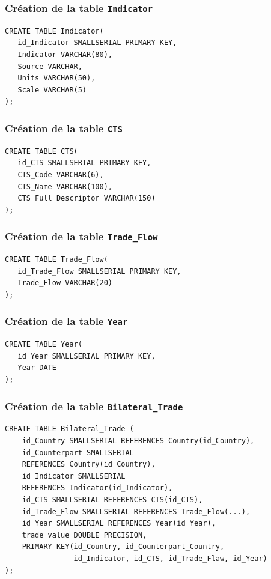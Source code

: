 \documentclass[11pt]{beamer}
\begin{document}
\begin{frame}[fragile]
  \frametitle{Création de la table \texttt{Indicator}}
\begin{verbatim}
CREATE TABLE Indicator(
   id_Indicator SMALLSERIAL PRIMARY KEY,
   Indicator VARCHAR(80),
   Source VARCHAR,
   Units VARCHAR(50),
   Scale VARCHAR(5)
);
\end{verbatim}
\end{frame}

\begin{frame}[fragile]
  \frametitle{Création de la table \texttt{CTS}}
\begin{verbatim}
CREATE TABLE CTS(
   id_CTS SMALLSERIAL PRIMARY KEY,
   CTS_Code VARCHAR(6),
   CTS_Name VARCHAR(100),
   CTS_Full_Descriptor VARCHAR(150)
);
\end{verbatim}
\end{frame}

\begin{frame}[fragile]
  \frametitle{Création de la table \texttt{Trade\_Flow}}
\begin{verbatim}
CREATE TABLE Trade_Flow(
   id_Trade_Flow SMALLSERIAL PRIMARY KEY,
   Trade_Flow VARCHAR(20)
);
\end{verbatim}
\end{frame}

\begin{frame}[fragile]
  \frametitle{Création de la table \texttt{Year}}
\begin{verbatim}
CREATE TABLE Year(
   id_Year SMALLSERIAL PRIMARY KEY,
   Year DATE
);
\end{verbatim}
\end{frame}

\begin{frame}[fragile]
  \frametitle{Création de la table \texttt{Bilateral\_Trade}}
\begin{verbatim}
CREATE TABLE Bilateral_Trade (
    id_Country SMALLSERIAL REFERENCES Country(id_Country),
    id_Counterpart SMALLSERIAL 
    REFERENCES Country(id_Country),
    id_Indicator SMALLSERIAL 
    REFERENCES Indicator(id_Indicator),
    id_CTS SMALLSERIAL REFERENCES CTS(id_CTS),
    id_Trade_Flow SMALLSERIAL REFERENCES Trade_Flow(...),
    id_Year SMALLSERIAL REFERENCES Year(id_Year),
    trade_value DOUBLE PRECISION,
    PRIMARY KEY(id_Country, id_Counterpart_Country,
                id_Indicator, id_CTS, id_Trade_Flaw, id_Year)
);
\end{verbatim}
\end{frame}
\end{document}
